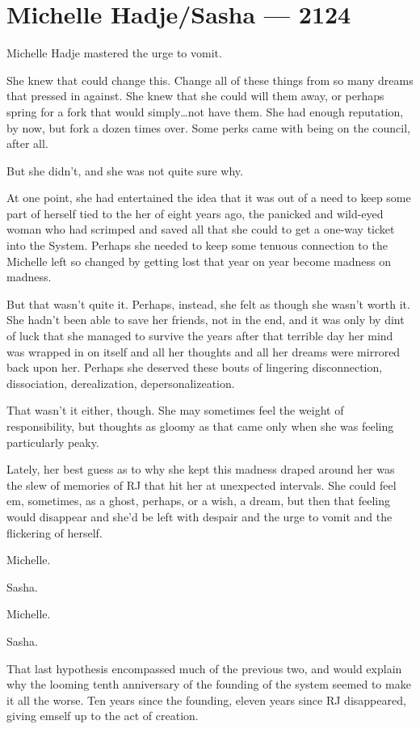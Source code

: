 \hypertarget{michelle-hadjesasha-2124}{%
\chapter{Michelle Hadje/Sasha — 2124}\label{michelle-hadjesasha-2124}}

Michelle Hadje mastered the urge to vomit.

She knew that could change this. Change all of these things from so many dreams that pressed in against. She knew that she could will them away, or perhaps spring for a fork that would simply\ldots not have them. She had enough reputation, by now, but fork a dozen times over. Some perks came with being on the council, after all.

But she didn't, and she was not quite sure why.

At one point, she had entertained the idea that it was out of a need to keep some part of herself tied to the her of eight years ago, the panicked and wild-eyed woman who had scrimped and saved all that she could to get a one-way ticket into the System. Perhaps she needed to keep some tenuous connection to the Michelle left so changed by getting lost that year on year become madness on madness.

But that wasn't quite it. Perhaps, instead, she felt as though she wasn't worth it. She hadn't been able to save her friends, not in the end, and it was only by dint of luck that she managed to survive the years after that terrible day her mind was wrapped in on itself and all her thoughts and all her dreams were mirrored back upon her. Perhaps she deserved these bouts of lingering disconnection, dissociation, derealization, depersonalizeation.

That wasn't it either, though. She may sometimes feel the weight of responsibility, but thoughts as gloomy as that came only when she was feeling particularly peaky.

Lately, her best guess as to why she kept this madness draped around her was the slew of memories of RJ that hit her at unexpected intervals. She could feel em, sometimes, as a ghost, perhaps, or a wish, a dream, but then that feeling would disappear and she'd be left with despair and the urge to vomit and the flickering of herself.

Michelle.

Sasha.

Michelle.

Sasha.

That last hypothesis encompassed much of the previous two, and would explain why the looming tenth anniversary of the founding of the system seemed to make it all the worse. Ten years since the founding, eleven years since RJ disappeared, giving emself up to the act of creation.

